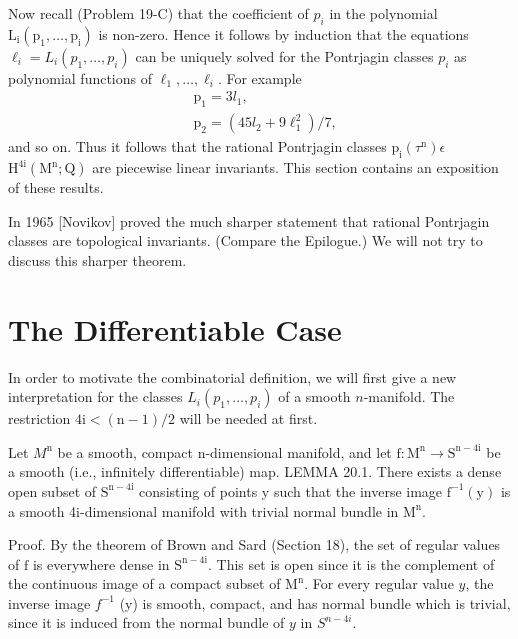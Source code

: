 \documentclass[10pt]{article}
\begin{document}
Now recall (Problem 19-C) that the coefficient of $p_{i}$ in the polynomial $\mathrm{L}_{\mathrm{i}}\left(\mathrm{p}_{1}, \ldots, \mathrm{p}_{\mathrm{i}}\right)$ is non-zero. Hence it follows by induction that the equations $\ell_{i}=L_{i}\left(p_{1}, \ldots, p_{i}\right)$ can be uniquely solved for the Pontrjagin classes $p_{i}$ as polynomial functions of $\ell_{1}, \ldots, \ell_{i}$. For example
$$
\begin{aligned}
&\mathrm{p}_{1}=3 l_{1}, \\
&\mathrm{p}_{2}=\left(45 l_{2}+9 \ell_{1}^{2}\right) / 7,
\end{aligned}
$$
and so on. Thus it follows that the rational Pontrjagin classes $\mathrm{p}_{\mathrm{i}}\left(\tau^{\mathrm{n}}\right) \epsilon$ $\mathrm{H}^{4 \mathrm{i}}\left(\mathrm{M}^{\mathrm{n}} ; \mathrm{Q}\right)$ are piecewise linear invariants. This section contains an exposition of these results.

In 1965 [Novikov] proved the much sharper statement that rational Pontrjagin classes are topological invariants. (Compare the Epilogue.) We will not try to discuss this sharper theorem.

\section{The Differentiable Case}
In order to motivate the combinatorial definition, we will first give a new interpretation for the classes $L_{i}\left(p_{1}, \ldots, p_{i}\right)$ of a smooth $n$-manifold. The restriction $4 \mathrm{i}<(\mathrm{n}-1) / 2$ will be needed at first.

Let $M^{\mathrm{n}}$ be a smooth, compact $\mathrm{n}$-dimensional manifold, and let $\mathrm{f}: \mathrm{M}^{\mathrm{n}} \rightarrow \mathrm{S}^{\mathrm{n}-4 \mathrm{i}}$ be a smooth (i.e., infinitely differentiable) map. LEMMA 20.1. There exists a dense open subset of $\mathrm{S}^{\mathrm{n}-4 \mathrm{i}}$ consisting of points y such that the inverse image $\mathrm{f}^{-1}(\mathrm{y})$ is a smooth 4i-dimensional manifold with trivial normal bundle in $\mathrm{M}^{\mathrm{n}}$.

Proof. By the theorem of Brown and Sard (Section 18), the set of regular values of $\mathrm{f}$ is everywhere dense in $\mathrm{S}^{\mathrm{n}-4 \mathrm{i}}$. This set is open since it is the complement of the continuous image of a compact subset of $\mathrm{M}^{\mathrm{n}}$. For every regular value $y$, the inverse image $f^{-1}$ (y) is smooth, compact, and has normal bundle which is trivial, since it is induced from the normal bundle of $y$ in $S^{n-4 i}$.
\end{document}
